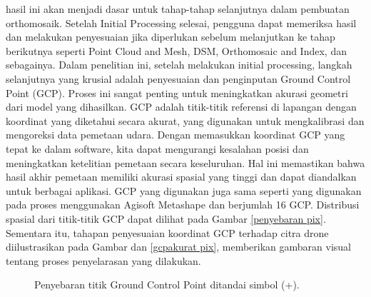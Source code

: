 hasil ini akan menjadi dasar untuk tahap-tahap selanjutnya dalam pembuatan orthomosaik. Setelah Initial Processing selesai, pengguna dapat memeriksa hasil dan melakukan penyesuaian jika diperlukan sebelum melanjutkan ke tahap berikutnya seperti Point Cloud and Mesh, DSM, Orthomosaic and Index, dan sebagainya. Dalam penelitian ini, setelah melakukan initial processing, langkah selanjutnya yang krusial adalah penyesuaian dan penginputan Ground Control Point (GCP). Proses ini sangat penting untuk meningkatkan akurasi geometri dari model yang dihasilkan. GCP adalah titik-titik referensi di lapangan dengan koordinat yang diketahui secara akurat, yang digunakan untuk mengkalibrasi dan mengoreksi data pemetaan udara. Dengan memasukkan koordinat GCP yang tepat ke dalam software, kita dapat mengurangi kesalahan posisi dan meningkatkan ketelitian pemetaan secara keseluruhan. Hal ini memastikan bahwa hasil akhir pemetaan memiliki akurasi spasial yang tinggi dan dapat diandalkan untuk berbagai aplikasi. GCP yang digunakan juga sama seperti yang digunakan pada proses menggunakan Agisoft Metashape dan berjumlah 16 GCP. Distribusi spasial dari titik-titik GCP dapat dilihat pada Gambar \ref{penyebaran  pix}. Sementara itu, tahapan penyesuaian koordinat GCP terhadap citra drone diilustrasikan pada Gambar dan \ref{gcpakurat pix}, memberikan gambaran visual tentang proses penyelarasan yang dilakukan. 

\begin{figure} [H]
    \centering
    \caption{Penyebaran titik Ground Control Point ditandai simbol (+).}
    \label{penyebaran pix}
\end{figure}

